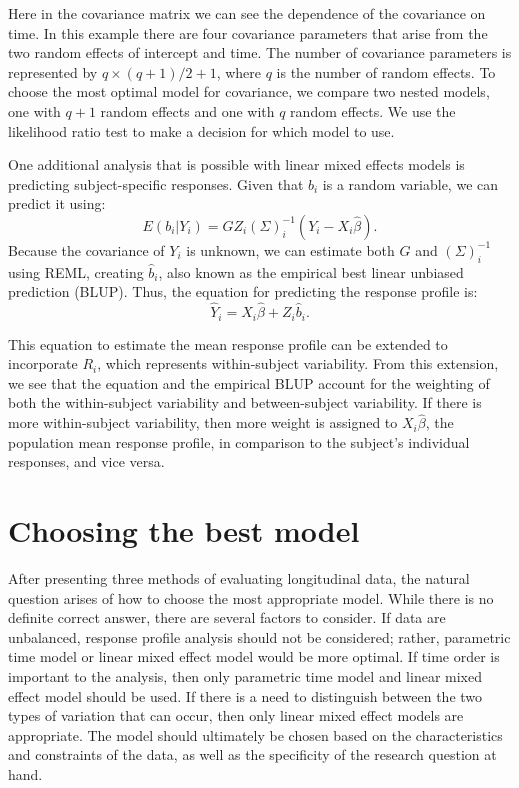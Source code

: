 \documentclass[12pt, twoside]{amherstthesis}
\begin{document}
Here in the covariance matrix we can see the dependence of the covariance on time. In this example there are four covariance parameters that arise from the two random effects of intercept and time. The number of covariance parameters is represented by \(q \times (q+1)/2 + 1\), where \(q\) is the number of random effects. To choose the most optimal model for covariance, we compare two nested models, one with \(q+1\) random effects and one with \(q\) random effects. We use the likelihood ratio test to make a decision for which model to use.

One additional analysis that is possible with linear mixed effects models is predicting subject-specific responses. Given that \(b_i\) is a random variable, we can predict it using:
\[E(b_i |Y_i) = GZ_i (\Sigma)^{-1}_i(Y_i-X_i\hat\beta).\] Because the covariance of \(Y_i\) is unknown, we can estimate both \(G\) and \((\Sigma)^{-1}_i\) using REML, creating \(\hat b_i\), also known as the empirical best linear unbiased prediction (BLUP). Thus, the equation for predicting the response profile is:
\[\hat Y_i = X_i\hat\beta +Z_i\hat b_i.\]

This equation to estimate the mean response profile can be extended to incorporate \(R_i\), which represents within-subject variability. From this extension, we see that the equation and the empirical BLUP account for the weighting of both the within-subject variability and between-subject variability. If there is more within-subject variability, then more weight is assigned to \(X_i\hat\beta\), the population mean response profile, in comparison to the subject's individual responses, and vice versa.

\hypertarget{choosing-the-best-model}{%
\section{Choosing the best model}\label{choosing-the-best-model}}

After presenting three methods of evaluating longitudinal data, the natural question arises of how to choose the most appropriate model. While there is no definite correct answer, there are several factors to consider. If data are unbalanced, response profile analysis should not be considered; rather, parametric time model or linear mixed effect model would be more optimal. If time order is important to the analysis, then only parametric time model and linear mixed effect model should be used. If there is a need to distinguish between the two types of variation that can occur, then only linear mixed effect models are appropriate. The model should ultimately be chosen based on the characteristics and constraints of the data, as well as the specificity of the research question at hand.
\end{document}
